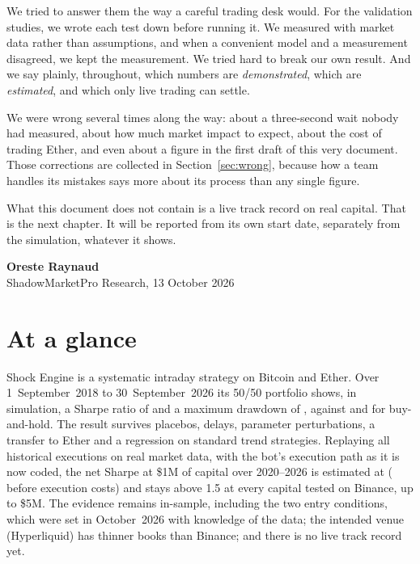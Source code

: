 \documentclass[11pt,a4paper]{article}
\begin{document}
We tried to answer them the way a careful trading desk would. For the validation studies, we wrote each test down before running it. We measured with
market data rather than assumptions, and when a convenient model and a measurement disagreed, we kept the measurement. We
tried hard to break our own result. And we say plainly, throughout, which numbers are \emph{demonstrated}, which are
\emph{estimated}, and which only live trading can settle.

We were wrong several times along the way: about a three-second wait nobody had measured, about how much market impact to
expect, about the cost of trading Ether, and even about a figure in the first draft of this very document. Those corrections
are collected in Section~\ref{sec:wrong}, because how a team handles its mistakes says more about its process than any single
figure.

What this document does not contain is a live track record on real capital. That is the next chapter. It will be reported from
its own start date, separately from the simulation, whatever it shows.

\vspace{6pt}
{\sffamily\bfseries\color{navy}Oreste Raynaud}\\
{\sffamily\small\color{muted}ShadowMarketPro Research, 13 October 2026}

\vspace{14pt}
{\sffamily\small
\renewcommand{\contentsname}{\sffamily\large\bfseries\color{navy}Contents}
\setcounter{tocdepth}{1}
\tableofcontents}

\newpage
\section*{At a glance}

Shock Engine is a systematic intraday strategy on Bitcoin and Ether. Over 1~September~2018 to 30~September~2026 its
50/50 portfolio shows, in simulation, a Sharpe ratio of \PfSharpe{} and a maximum drawdown of \PfMaxDD{}, against \BhSharpe{}
and \BhMaxDD{} for buy-and-hold. The result survives placebos, delays, parameter perturbations, a transfer to Ether and a
regression on standard trend strategies. Replaying all \NExec{} historical executions on real market data, with the bot's
execution path as it is now coded, the net Sharpe at \$1M of capital over 2020--2026 is estimated at \ShDeliveredOne{}
(\BtSharpe{} before execution costs) and stays above 1.5 at every capital tested on Binance, up to \$5M. The evidence remains
in-sample, including the two entry conditions, which were set in October~2026 with knowledge of the data; the intended venue
(Hyperliquid) has thinner books than Binance; and there is no live track record yet.
\end{document}
